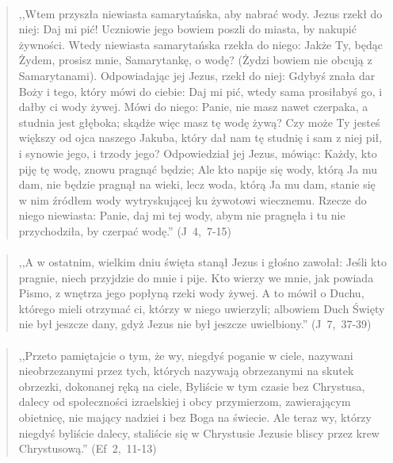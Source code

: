 \documentclass[10pt,a4paper,oneside]{article}
\begin{document}
\paragraph{}
\begin{quote}
,,Wtem przyszła niewiasta samarytańska, aby nabrać wody. Jezus rzekł do niej: Daj mi pić! Uczniowie jego bowiem poszli do miasta, by nakupić żywności. Wtedy niewiasta samarytańska rzekła do niego: Jakże Ty, będąc Żydem, prosisz mnie, Samarytankę, o wodę? (Żydzi bowiem nie obcują z Samarytanami). Odpowiadając jej Jezus, rzekł do niej: Gdybyś znała dar Boży i tego, który mówi do ciebie: Daj mi pić, wtedy sama prosiłabyś go, i dałby ci wody żywej. Mówi do niego: Panie, nie masz nawet czerpaka, a studnia jest głęboka; skądże więc masz tę wodę żywą? Czy może Ty jesteś większy od ojca naszego Jakuba, który dał nam tę studnię i sam z niej pił, i synowie jego, i trzody jego? Odpowiedział jej Jezus, mówiąc: Każdy, kto piję tę wodę, znowu pragnąć będzie; Ale kto napije się wody, którą Ja mu dam, nie będzie pragnął na wieki, lecz woda, którą Ja mu dam, stanie się w nim źródłem wody wytryskującej ku żywotowi wiecznemu. Rzecze do niego niewiasta: Panie, daj mi tej wody, abym nie pragnęła i tu nie przychodziła, by czerpać wodę.'' \mbox{(J 4, 7-15)}
\end{quote}
\paragraph{}
\begin{quote}
,,A w ostatnim, wielkim dniu święta stanął Jezus i głośno zawołał: Jeśli kto pragnie, niech przyjdzie do mnie i pije. Kto wierzy we mnie, jak powiada Pismo, z wnętrza jego popłyną rzeki wody żywej. A to mówił o Duchu, którego mieli otrzymać ci, którzy w niego uwierzyli; albowiem Duch Święty nie był jeszcze dany, gdyż Jezus nie był jeszcze uwielbiony.'' \mbox{(J 7, 37-39)}
\end{quote}
\paragraph{}
\begin{quote}
,,Przeto pamiętajcie o tym, że wy, niegdyś poganie w ciele, nazywani nieobrzezanymi przez tych, których nazywają obrzezanymi na skutek obrzezki, dokonanej ręką na ciele, Byliście w tym czasie bez Chrystusa, dalecy od społeczności izraelskiej i obcy przymierzom, zawierającym obietnicę, nie mający nadziei i bez Boga na świecie. Ale teraz wy, którzy niegdyś byliście dalecy, staliście się w Chrystusie Jezusie bliscy przez krew Chrystusową.'' \mbox{(Ef 2, 11-13)}
\end{quote}
\end{document}
